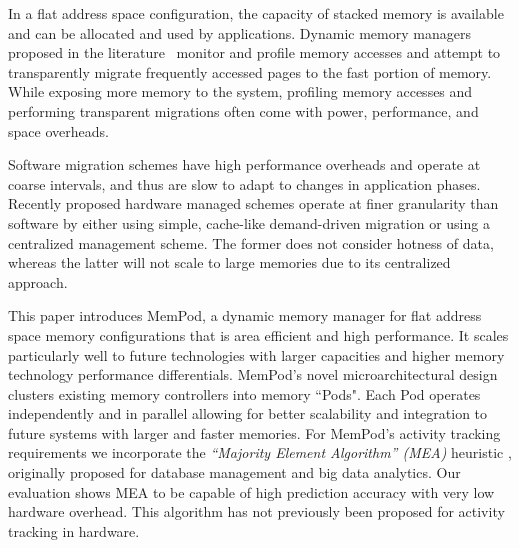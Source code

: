 In a flat address space configuration, the capacity of stacked memory is 
available and can be allocated and used by applications. Dynamic memory 
managers proposed in the literature~\cite{sim-micro2014,meswani-HPCA21,CAMEO} 
monitor and profile memory accesses and attempt to transparently migrate 
frequently accessed pages to the fast portion of memory. While exposing
more memory to the system, profiling memory accesses and performing 
transparent migrations often come with power, performance, and space overheads. 



Software migration schemes \cite{meswani-HPCA21} have high performance 
overheads and operate at coarse intervals, and thus are slow to adapt to 
changes in application phases. Recently proposed hardware managed schemes \cite{sim-micro2014,CAMEO} operate at finer granularity than software by either using simple, cache-like demand-driven migration or using a centralized management scheme. The former does not consider hotness of data, whereas the latter will not scale to large memories due to its centralized approach.

This paper introduces MemPod, a dynamic memory manager for flat address space memory configurations that is area efficient and high performance.
It scales particularly well to future technologies with larger capacities and
higher memory technology performance differentials. 
MemPod's novel microarchitectural design clusters existing memory controllers into memory ``Pods". Each Pod operates independently and in parallel allowing for better scalability and integration to future systems with larger and faster memories. For MemPod's activity tracking requirements we incorporate the \emph{``Majority Element Algorithm'' (MEA)} heuristic \cite{karp-mea,charikar-mea}, originally proposed for database management and big data analytics. Our evaluation shows MEA to be capable of high prediction accuracy with very low hardware overhead. This algorithm has 
not previously been proposed for activity tracking in hardware.

